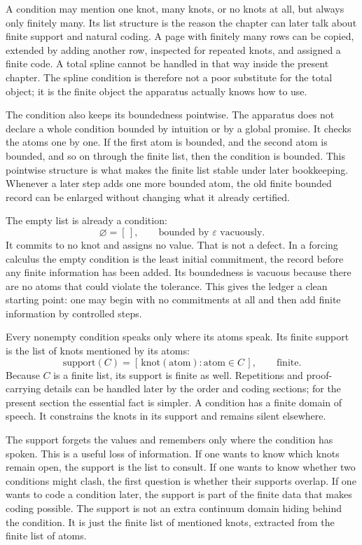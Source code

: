 A condition may mention one knot, many knots, or no knots at all, but always
only finitely many. Its list structure is the reason the chapter can later talk
about finite support and natural coding. A page with finitely many rows can be
copied, extended by adding another row, inspected for repeated knots, and
assigned a finite code. A total spline cannot be handled in that way inside the
present chapter. The spline condition is therefore not a poor substitute for the
total object; it is the finite object the apparatus actually knows how to use.

The condition also keeps its boundedness pointwise. The apparatus does not
declare a whole condition bounded by intuition or by a global promise. It
checks the atoms one by one. If the first atom is bounded, and the second atom
is bounded, and so on through the finite list, then the condition is bounded.
This pointwise structure is what makes the finite list stable under later
bookkeeping. Whenever a later step adds one more bounded atom, the old finite
bounded record can be enlarged without changing what it already certified.

The empty list is already a condition:
\[
  \varnothing = [\,],
  \qquad
  \text{bounded by } \varepsilon \text{ vacuously.}
\]
It commits to no knot and assigns no value. That is not a defect. In a forcing
calculus the empty condition is the least initial commitment, the record before
any finite information has been added. Its boundedness is vacuous because there
are no atoms that could violate the tolerance. This gives the ledger a clean
starting point: one may begin with no commitments at all and then add finite
information by controlled steps.

Every nonempty condition speaks only where its atoms speak. Its finite support
is the list of knots mentioned by its atoms:
\[
  \mathrm{support}(C) = [\,\mathrm{knot}(\text{atom}) : \text{atom} \in C\,],
  \qquad
  \text{finite.}
\]
Because \(C\) is a finite list, its support is finite as well. Repetitions and
proof-carrying details can be handled later by the order and coding sections;
for the present section the essential fact is simpler. A condition has a finite
domain of speech. It constrains the knots in its support and remains silent
elsewhere.

The support forgets the values and remembers only where the condition has
spoken. This is a useful loss of information. If one wants to know which knots
remain open, the support is the list to consult. If one wants to know whether
two conditions might clash, the first question is whether their supports
overlap. If one wants to code a condition later, the support is part of the
finite data that makes coding possible. The support is not an extra continuum
domain hiding behind the condition. It is just the finite list of mentioned
knots, extracted from the finite list of atoms.

